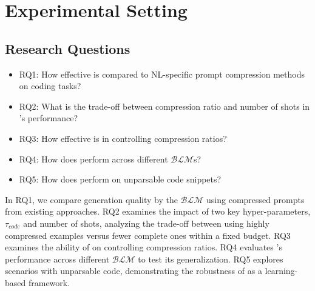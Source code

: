 \section{Experimental Setting}\label{sec:experimentalsetting}



\subsection{Research Questions}
\begin{itemize}
    \setlength\itemsep{-0.07in} %
    \item RQ1: How effective is \ourtool compared to NL-specific prompt compression methods on coding tasks?
    \item RQ2: What is the trade-off between compression ratio and number of shots in \ourtool's performance?
    \item RQ3: How effective is \ourtool in controlling compression ratios?
    \item RQ4: How does \ourtool perform across different $\mathcal{BLM}$s?
    \item RQ5: How does \ourtool perform on unparsable code snippets? 
\end{itemize}

In RQ1, we compare generation quality by the
$\mathcal{BLM}$ using compressed prompts from existing approaches. RQ2 examines the impact of two key hyper-parameters, $\tau_{code}$ and number of shots, analyzing the trade-off between using highly compressed examples versus fewer complete ones within a fixed budget. RQ3 examines the ability of \ourtool on controlling compression ratios. RQ4 evaluates \ourtool's performance across different $\mathcal{BLM}$ to test its generalization. RQ5 explores scenarios with unparsable code, demonstrating the robustness of \ourtool as a learning-based framework.



